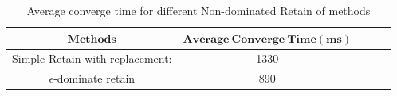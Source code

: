 \documentclass[12pt, runningheads,a4paper]{llncs}
\begin{document}
\begin{table}
  \caption {Average converge time for different Non-dominated Retain of methods}  
  \label{tab:compare2}
    \begin{center}
\begin{tabular}{c|cccc} 
\toprule 
	$\mathbf{Methods}$   & $\mathbf{Average\ Converge\ Time (ms)}$\\
	\hline Simple Retain with replacement: &  1330 \\ 
         $\epsilon$-dominate retain & 890 \\
\bottomrule 
\end{tabular} 
\end{center}
\end{table}
\end{document}
